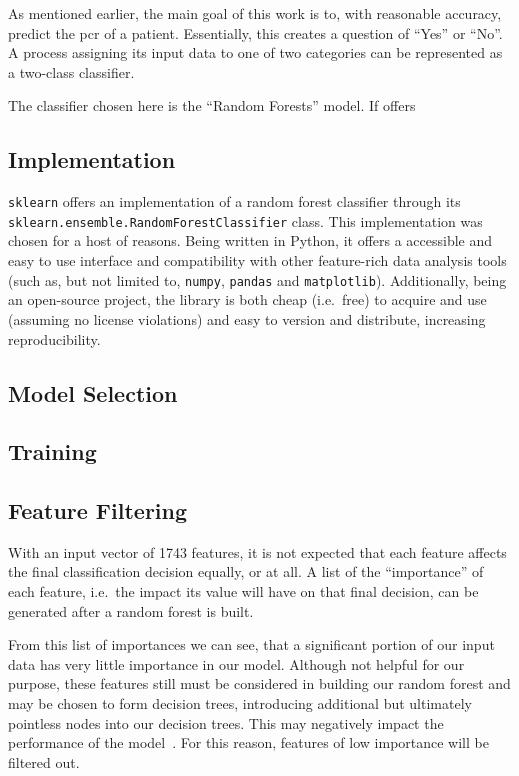 As mentioned earlier, the main goal of this work is to, with reasonable 
accuracy, predict the \ac{pcr} of a patient. Essentially, this creates a 
question of \enquote{Yes} or \enquote{No}. A process assigning its input data to 
one of two categories can be represented as a two-class classifier. 

The classifier chosen here is the \enquote{Random Forests} model. If offers 


\subsection{Implementation}

\texttt{sklearn} offers an implementation of a random forest classifier through
its \\\texttt{sklearn.ensemble.RandomForestClassifier} class. This implementation
was chosen for a host of reasons. Being written in Python, it offers a 
accessible and easy to use interface and compatibility with other feature-rich
data analysis tools (such as, but not limited to, \texttt{numpy}, 
\texttt{pandas} and \texttt{matplotlib}). Additionally, being an open-source
project, the library is both cheap (i.e.~free) to acquire and use 
(assuming no license violations) and easy to version and distribute, increasing 
reproducibility. 



\subsection{Model Selection}

\subsection{Training}

\subsection{Feature Filtering}

With an input vector of 1743 features, it is not expected that each feature 
affects the final classification decision equally, or at all. 
A list of the \enquote{importance} of each feature, i.e.~the impact its value 
will have on that final decision, can be generated after a random forest is 
built.

From this list of importances we can see, that a significant portion of our 
input data has very little importance in our model. Although not helpful for our 
purpose, these features still must be considered in building our random forest 
and may be chosen to form decision trees, introducing additional but ultimately 
pointless nodes into our decision trees. This may negatively impact the 
performance of the model~\cite{elements_of_statistical_learning}.
For this reason, features of low importance will be filtered out.

